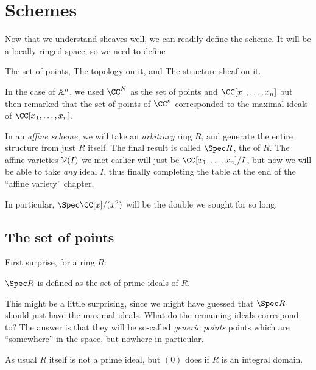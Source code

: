 \documentclass[11pt]{scrreprt}
\begin{document}
\chapter{Schemes}
Now that we understand sheaves well, we can readily define the scheme.
It will be a locally ringed space, so we need to define
\begin{itemize}
	\ii The set of points,
	\ii The topology on it, and
	\ii The structure sheaf on it.
\end{itemize}

In the case of $\mathbb A^n$, we used $\CC^N$ as the set of points
and $\CC[x_1, \dots, x_n]$ but then remarked that the set of points
of $\CC^n$ corresponded to the maximal ideals of $\CC[x_1, \dots, x_n]$.

In an \emph{affine scheme}, we will take an \emph{arbitrary} ring $R$,
and generate the entire structure from just $R$ itself.
The final result is called $\Spec R$, the  of $R$.
The affine varieties $\mathcal V(I)$ we met earlier will just be
$\CC[x_1, \dots, x_n] / I$, but now we will be able to take
\emph{any} ideal $I$, thus finally completing the table at the end
of the ``affine variety'' chapter.

In particular, $\Spec \CC[x] / (x^2)$ will be the double we sought for so long.

\section{The set of points}

First surprise, for a ring $R$:
\begin{moral}
	$\Spec R$ is defined as the set of prime ideals of $R$.
\end{moral}

This might be a little surprising, since we might have guessed
that $\Spec R$ should just have the maximal ideals.
What do the remaining ideals correspond to?
The answer is that they will be so-called \emph{generic points}
points which are ``somewhere'' in the space, but nowhere in particular.

\begin{remark}
	As usual $R$ itself is not a prime ideal, but $(0)$
	does if $R$ is an integral domain.
\end{remark}
\end{document}
